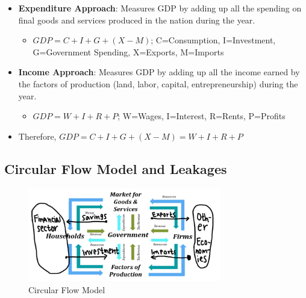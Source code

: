 \documentclass[
  letterpaper,
  DIV=11,
  numbers=noendperiod]{scrartcl}
\providecommand{\tightlist}{%
  \setlength{\itemsep}{0pt}\setlength{\parskip}{0pt}}\usepackage{longtable,booktabs,array}
\begin{document}
\begin{itemize}
\tightlist
\item
  \textbf{Expenditure Approach}: Measures GDP by adding up all the
  spending on final goods and services produced in the nation during the
  year.

  \begin{itemize}
  \tightlist
  \item
    \(GDP = C + I + G + (X-M)\); C=Consumption, I=Investment,
    G=Government Spending, X=Exports, M=Imports
  \end{itemize}
\item
  \textbf{Income Approach}: Measures GDP by adding up all the income
  earned by the factors of production (land, labor, capital,
  entrepreneurship) during the year.

  \begin{itemize}
  \tightlist
  \item
    \(GDP = W + I + R + P\); W=Wages, I=Interest, R=Rents, P=Profits
  \end{itemize}
\item
  Therefore, \(GDP = C + I + G + (X-M) = W + I + R + P\)
\end{itemize}

\newpage{}

\hypertarget{circular-flow-model-and-leakages}{%
\subsection{Circular Flow Model and
Leakages}\label{circular-flow-model-and-leakages}}

\begin{figure}

{\centering \includegraphics[width=0.75\textwidth,height=\textheight]{img/circular-flow.png}

}

\caption{Circular Flow Model}

\end{figure}
\end{document}
